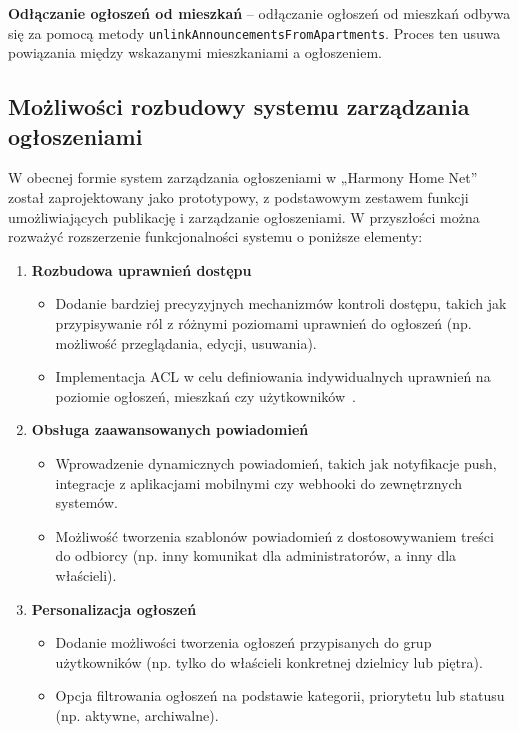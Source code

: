 \textbf{Odłączanie ogłoszeń od mieszkań} -- odłączanie ogłoszeń od mieszkań odbywa się za pomocą metody \texttt{unlinkAnnouncementsFromApartments}. Proces ten usuwa powiązania między wskazanymi mieszkaniami a ogłoszeniem.

\subsection{Możliwości rozbudowy systemu zarządzania ogłoszeniami}

W obecnej formie system zarządzania ogłoszeniami w „Harmony Home Net” został zaprojektowany jako prototypowy, z podstawowym zestawem funkcji umożliwiających publikację i zarządzanie ogłoszeniami. W przyszłości można rozważyć rozszerzenie funkcjonalności systemu o poniższe elementy:

\begin{enumerate}
    \item \textbf{Rozbudowa uprawnień dostępu}
    \begin{itemize}
        \item Dodanie bardziej precyzyjnych mechanizmów kontroli dostępu, takich jak przypisywanie ról z różnymi poziomami uprawnień do ogłoszeń (np. możliwość przeglądania, edycji, usuwania).
        \item Implementacja ACL w celu definiowania indywidualnych uprawnień na poziomie ogłoszeń, mieszkań czy użytkowników~\cite{acl, acl_2}.
    \end{itemize}

    \item \textbf{Obsługa zaawansowanych powiadomień}
    \begin{itemize}
        \item Wprowadzenie dynamicznych powiadomień, takich jak notyfikacje push, integracje z aplikacjami mobilnymi czy webhooki do zewnętrznych systemów.
        \item Możliwość tworzenia szablonów powiadomień z dostosowywaniem treści do odbiorcy (np. inny komunikat dla administratorów, a inny dla właścieli).
    \end{itemize}

    \item \textbf{Personalizacja ogłoszeń}
    \begin{itemize}
        \item Dodanie możliwości tworzenia ogłoszeń przypisanych do grup użytkowników (np. tylko do właścieli konkretnej dzielnicy lub piętra).
        \item Opcja filtrowania ogłoszeń na podstawie kategorii, priorytetu lub statusu (np. aktywne, archiwalne).
    \end{itemize}


\end{enumerate}
